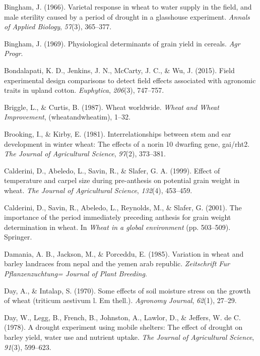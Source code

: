 \documentclass[12pt,oneside]{dukestatscithesis} %
\newlength{\cslhangindent}
\newenvironment{cslreferences}%
  {\setlength{\parindent}{0pt}%
  \everypar{\setlength{\hangindent}{\cslhangindent}}\ignorespaces}%
  {\par}
\begin{document}
\begin{cslreferences}
\leavevmode\hypertarget{ref-bingham1966varietal}{}%
Bingham, J. (1966). Varietal response in wheat to water supply in the field, and male sterility caused by a period of drought in a glasshouse experiment. \emph{Annals of Applied Biology}, \emph{57}(3), 365--377.

\leavevmode\hypertarget{ref-bingham1969physiological}{}%
Bingham, J. (1969). Physiological determinants of grain yield in cereals. \emph{Agr Progr}.

\leavevmode\hypertarget{ref-bondalapati2015field}{}%
Bondalapati, K. D., Jenkins, J. N., McCarty, J. C., \& Wu, J. (2015). Field experimental design comparisons to detect field effects associated with agronomic traits in upland cotton. \emph{Euphytica}, \emph{206}(3), 747--757.

\leavevmode\hypertarget{ref-briggle1987wheat}{}%
Briggle, L., \& Curtis, B. (1987). Wheat worldwide. \emph{Wheat and Wheat Improvement}, (wheatandwheatim), 1--32.

\leavevmode\hypertarget{ref-brooking1981interrelationships}{}%
Brooking, I., \& Kirby, E. (1981). Interrelationships between stem and ear development in winter wheat: The effects of a norin 10 dwarfing gene, gai/rht2. \emph{The Journal of Agricultural Science}, \emph{97}(2), 373--381.

\leavevmode\hypertarget{ref-calderini1999effect}{}%
Calderini, D., Abeledo, L., Savin, R., \& Slafer, G. A. (1999). Effect of temperature and carpel size during pre-anthesis on potential grain weight in wheat. \emph{The Journal of Agricultural Science}, \emph{132}(4), 453--459.

\leavevmode\hypertarget{ref-calderini2001importance}{}%
Calderini, D., Savin, R., Abeledo, L., Reynolds, M., \& Slafer, G. (2001). The importance of the period immediately preceding anthesis for grain weight determination in wheat. In \emph{Wheat in a global environment} (pp. 503--509). Springer.

\leavevmode\hypertarget{ref-damania1985variation}{}%
Damania, A. B., Jackson, M., \& Porceddu, E. (1985). Variation in wheat and barley landraces from nepal and the yemen arab republic. \emph{Zeitschrift Fur Pflanzenzuchtung= Journal of Plant Breeding}.

\leavevmode\hypertarget{ref-day1970some}{}%
Day, A., \& Intalap, S. (1970). Some effects of soil moisture stress on the growth of wheat (triticum aestivum l. Em thell.). \emph{Agronomy Journal}, \emph{62}(1), 27--29.

\leavevmode\hypertarget{ref-day1978drought}{}%
Day, W., Legg, B., French, B., Johnston, A., Lawlor, D., \& Jeffers, W. de C. (1978). A drought experiment using mobile shelters: The effect of drought on barley yield, water use and nutrient uptake. \emph{The Journal of Agricultural Science}, \emph{91}(3), 599--623.


\end{cslreferences}
\end{document}
